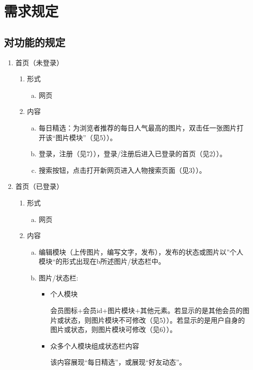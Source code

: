 \documentclass[a4paper,14pt]{ctexart}
\begin{document}
\section{需求规定}
\subsection{对功能的规定}



\begin{enumerate}[1)]

\item 首页（未登录）
\begin{enumerate}[i]
\item 形式
	\begin{enumerate}[a)]
	\item 网页
\end{enumerate}
\item 内容
	\begin{enumerate}[a)]
\item  每日精选：为浏览者推荐的每日人气最高的图片，双击任一张图片打开该“图片模块”（见5））。
\item 登录，注册（见7）），登录/注册后进入已登录的首页（见2））。
\item 搜索按钮，点击打开新网页进入人物搜索页面（见3））。
\end{enumerate}
\end{enumerate}

\item 首页（已登录）
\begin{enumerate}[i]
\item 形式
	\begin{enumerate}[a)]
	\item 网页
\end{enumerate}
\item 内容
	\begin{enumerate}[a)]
\item  编辑模块（上传图片，编写文字，发布），发布的状态或图片以”个人模块“的形式出现在b所述图片/状态栏中。
\item 图片/状态栏:
\begin{itemize}
\item 个人模块\par
会员图标+会员id+图片模块+其他元素。若显示的是其他会员的图片或状态，则图片模块不可修改（见5））。若显示的是用户自身的图片或状态，则图片模块可修改（见6））。
\item 众多个人模块组成状态栏内容 \par
该内容展现“每日精选”，或展现“好友动态”。


\end{itemize}
\end{enumerate}
\end{enumerate}
\end{enumerate}
\end{document}
